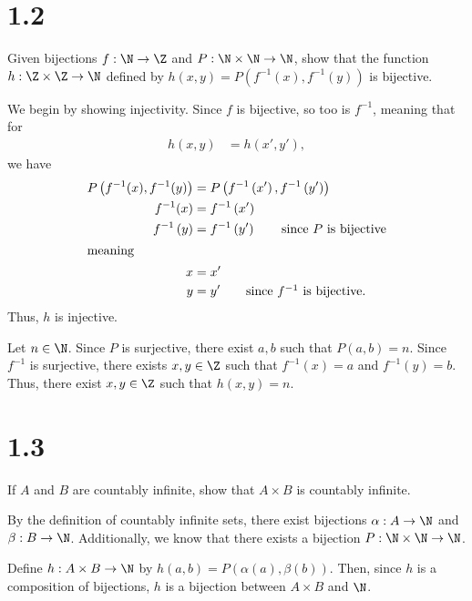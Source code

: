 \documentclass[10pt]{mypackage}
\begin{document}
\section{1.2}%
\begin{problem}
  Given bijections $f: \N\rightarrow \Z$ and $P: \N\times\N\rightarrow \N$, show that the function $h: \Z\times \Z \rightarrow \N$ defined by $h(x,y) = P\left(f^{-1}\left(x\right),f^{-1}\left(y\right)\right)$ is bijective.
\end{problem}
\begin{solution}
  We begin by showing injectivity. Since $f$ is bijective, so too is $f^{-1}$, meaning that for
  \begin{align*}
    h\left(x,y\right) &= h\left(x',y'\right),
  \end{align*}
  we have
  \begin{align*}
    P\left(f^{-1}(x),f^{-1}(y)\right) &= P\left(f^{-1}\left(x'\right),f^{-1}\left(y'\right)\right)\\
    f^{-1}(x) &= f^{-1}\left(x'\right)\\
    f^{-1}\left(y\right) &= f^{-1}\left(y'\right) \tag*{since $P$ is bijective}\\
    \intertext{meaning}
    x &= x'\\
    y &= y'\tag*{since $f^{-1}$ is bijective.}
  \end{align*}
  Thus, $h$ is injective.\newline

  Let $n\in \N$. Since $P$ is surjective, there exist $a,b$ such that $P\left(a,b\right) = n$. Since $f^{-1}$ is surjective, there exists $x,y\in \Z$ such that $f^{-1}\left(x\right) = a$ and $f^{-1}\left(y\right) = b$. Thus, there exist $x,y\in \Z$ such that $h\left(x,y\right) = n$.
\end{solution}
\section{1.3}%
\begin{problem}
  If $A$ and $B$ are countably infinite, show that $A\times B$ is countably infinite.%
\end{problem}
\begin{solution}
  By the definition of countably infinite sets, there exist bijections $\alpha: A\rightarrow \N$ and $\beta: B\rightarrow \N$. Additionally, we know that there exists a bijection $P: \N\times \N \rightarrow \N$.\newline

  Define $h: A\times B \rightarrow \N$ by $h(a,b) = P\left(\alpha\left(a\right),\beta\left(b\right)\right)$. Then, since $h$ is a composition of bijections, $h$ is a bijection between $A\times B$ and $\N$.
\end{solution}
\end{document}
